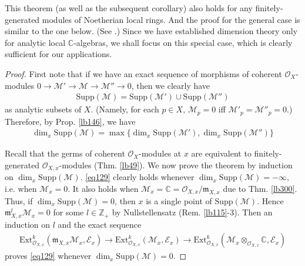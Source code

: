 \documentclass[12pt,b5paper,notitlepage]{report}
\theoremstyle{definition}
\theoremstyle{plain}
\newcommand{\scr}{\mathscr}
\newcommand{\Cbb}{\mathbb C}
\newcommand{\Zbb}{\mathbb Z}
\newcommand{\Supp}{\mathrm{Supp}}
\newcommand{\Ext}{\mathrm{Ext}}
\newcommand{\mk}{\mathfrak m}
\numberwithin{equation}{section}
\begin{document}
This theorem (as well as the subsequent corollary) also holds for any finitely-generated modules of Noetherian local rings. And the proof for the general case is similar to the one below. (See \cite[Sec. 26.1]{Vak17}.) Since we have established dimension theory only for analytic local $\Cbb$-algebras, we shall focus on this special case, which is clearly sufficient for our applications.

\begin{proof}
First note that if we have an exact sequence of morphisms of coherent $\scr O_X$-modules $0\rightarrow\scr M'\rightarrow\scr M\rightarrow\scr M''\rightarrow0$, then we clearly have
\begin{align*}
\Supp(\scr M)=\Supp(\scr M')\cup\Supp(\scr M'')
\end{align*}
as analytic subsets of $X$. (Namely, for each $p\in X$, $\scr M_p=0$ iff $\scr M'_p=\scr M''_p=0$.) Therefore, by Prop. \ref{lb146}, we have
\begin{align}
\dim_x\Supp(\scr M)=\max\big\{\dim_x\Supp(\scr M'),\dim_x\Supp(\scr M'') \big\}  \label{eq130}
\end{align}

Recall that the germs of coherent $\scr O_X$-modules at $x$ are equivalent to finitely-generated $\scr O_{X,x}$-modules (Thm. \ref{lb49}). We now prove the theorem by induction on $\dim_x\Supp(\scr M)$. \eqref{eq129} clearly holds whenever $\dim_x\Supp(\scr M)=-\infty$, i.e. when $\scr M_x=0$. It also holds when $\scr M_x=\Cbb=\scr O_{X,x}/\mk_{X,x}$ due to Thm. \ref{lb300}. Thus, if $\dim_x\Supp(\scr M)=0$, then $x$ is a single point of $\Supp(\scr M)$. Hence $\mk_{X,x}^l\scr M_x=0$ for some $l\in\Zbb_+$ by Nullstellensatz (Rem. \ref{lb115}-3). Then an induction on $l$ and the exact sequence
\begin{align*}
\Ext_{\scr O_{X,x}}^k(\mk_{X,x}\scr M_x,\scr E_x)\rightarrow\Ext_{\scr O_{X,x}}^k(\scr M_x,\scr E_x)\rightarrow\Ext_{\scr O_{X,x}}^k(\scr M_x\otimes_{\scr O_{X,x}}\Cbb,\scr E_x)
\end{align*}
proves \eqref{eq129} whenever $\dim_x\Supp(\scr M)=0$.


\end{proof}
\end{document}
